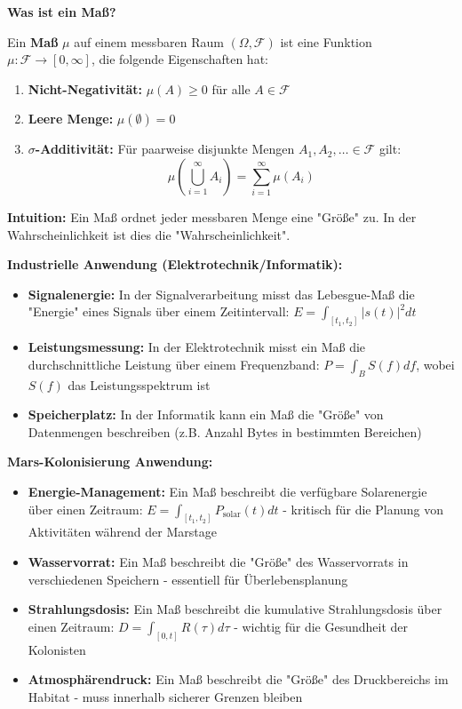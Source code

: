\begin{denoobification}[Maß]
\textbf{Was ist ein Maß?}

Ein \textbf{Maß} $\mu$ auf einem messbaren Raum $(\Omega, \mathcal{F})$ ist eine Funktion $\mu: \mathcal{F} \to [0, \infty]$, die folgende Eigenschaften hat:

\begin{enumerate}
    \item \textbf{Nicht-Negativität:} $\mu(A) \geq 0$ für alle $A \in \mathcal{F}$
    \item \textbf{Leere Menge:} $\mu(\emptyset) = 0$
    \item \textbf{$\sigma$-Additivität:} Für paarweise disjunkte Mengen $A_1, A_2, \ldots \in \mathcal{F}$ gilt:
    \[
    \mu\left(\bigcup_{i=1}^{\infty} A_i\right) = \sum_{i=1}^{\infty} \mu(A_i)
    \]
\end{enumerate}

\textbf{Intuition:} Ein Maß ordnet jeder messbaren Menge eine "Größe" zu. In der Wahrscheinlichkeit ist dies die "Wahrscheinlichkeit".

\textbf{Industrielle Anwendung (Elektrotechnik/Informatik):}
\begin{itemize}
    \item \textbf{Signalenergie:} In der Signalverarbeitung misst das Lebesgue-Maß die "Energie" eines Signals über einem Zeitintervall: $E = \int_{[t_1,t_2]} |s(t)|^2 dt$
    \item \textbf{Leistungsmessung:} In der Elektrotechnik misst ein Maß die durchschnittliche Leistung über einem Frequenzband: $P = \int_B S(f) df$, wobei $S(f)$ das Leistungsspektrum ist
    \item \textbf{Speicherplatz:} In der Informatik kann ein Maß die "Größe" von Datenmengen beschreiben (z.B. Anzahl Bytes in bestimmten Bereichen)
\end{itemize}

\textbf{Mars-Kolonisierung Anwendung:}
\begin{itemize}
    \item \textbf{Energie-Management:} Ein Maß beschreibt die verfügbare Solarenergie über einen Zeitraum: $E = \int_{[t_1,t_2]} P_{\text{solar}}(t) dt$ - kritisch für die Planung von Aktivitäten während der Marstage
    \item \textbf{Wasservorrat:} Ein Maß beschreibt die "Größe" des Wasservorrats in verschiedenen Speichern - essentiell für Überlebensplanung
    \item \textbf{Strahlungsdosis:} Ein Maß beschreibt die kumulative Strahlungsdosis über einen Zeitraum: $D = \int_{[0,t]} R(\tau) d\tau$ - wichtig für die Gesundheit der Kolonisten
    \item \textbf{Atmosphärendruck:} Ein Maß beschreibt die "Größe" des Druckbereichs im Habitat - muss innerhalb sicherer Grenzen bleiben
\end{itemize}


\end{denoobification}
